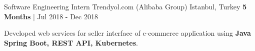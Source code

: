 \begin{cventries}
{    }
  \cvexpentry
   {Software Engineering Intern} %
    {Trendyol.com (Alibaba Group)} %
    {Istanbul, Turkey} %
    {\textbf{5 Months} | Jul 2018 - Dec 2018} %
    {
      \begin{cvitems} %
		 \item {Developed web services for seller interface of e-commerce application using \textbf{Java Spring Boot, REST API, Kubernetes}.}
      \end{cvitems}
    }
\begin{comment}
  \cvexpentry
   {Software Engineering Intern} %
    {Trendyol.com (Alibaba Group)} %
    {Istanbul, Turkey} %
    {\textbf{5 Months} | Jul 2018 - Dec 2018} %
    {
      \begin{cvitems} %
		 \item {Developed web services for seller interface of e-commerce application using \textbf{Java Spring Boot, REST API, Kubernetes}.}
      \end{cvitems}
    }
  \cventry
    {Research Assistant} %
    {Koc University, Arcelik Research Center for Creative Industries} %
    {Istanbul, Turkey} %
    {\textbf{1+ Years} | Oct 2016 - Feb 2018} %
    {
      \begin{cvitems} %

\end{comment}
\end{cventries}
